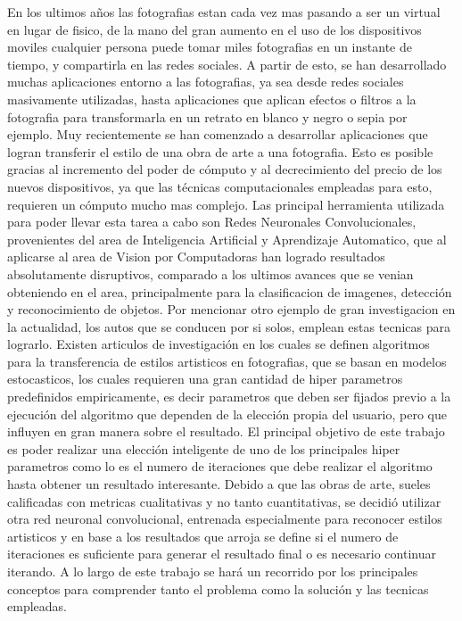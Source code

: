 \documentclass[a4paper,10pt]{article}
\begin{document}
En los ultimos años las fotografias estan cada vez mas pasando a ser un virtual en lugar de fisico, de la mano del gran aumento en el uso de los dispositivos moviles 
cualquier persona puede tomar miles fotografias en un instante de tiempo, y compartirla en las redes sociales.
A partir de esto, se han desarrollado muchas aplicaciones entorno a las fotografias, ya sea desde redes sociales masivamente utilizadas, hasta aplicaciones que aplican efectos o filtros 
a la fotografia para transformarla en un retrato en blanco y negro o sepia por ejemplo.
Muy recientemente se han comenzado a desarrollar aplicaciones que logran transferir el estilo de una obra de arte a una fotografia. Esto es posible gracias al incremento 
del poder de cómputo y al decrecimiento del precio de los nuevos dispositivos, ya que las técnicas computacionales empleadas para esto, requieren un cómputo mucho mas complejo.
Las principal herramienta utilizada para poder llevar esta tarea a cabo son Redes Neuronales Convolucionales, provenientes del area de  
Inteligencia Artificial y Aprendizaje Automatico, que al aplicarse al area de Vision por Computadoras han logrado resultados absolutamente disruptivos, 
comparado a los ultimos avances que se venian obteniendo en el area, principalmente para la clasificacion de imagenes, detección y reconocimiento de objetos.
Por mencionar otro ejemplo de gran investigacion en la actualidad, los autos que se conducen por si solos, emplean estas tecnicas para lograrlo.
Existen articulos de investigación en los cuales se definen algoritmos para la transferencia de estilos artisticos en fotografias, que se basan en modelos estocasticos, 
los cuales requieren una gran cantidad de hiper parametros predefinidos empiricamente, es decir parametros que deben ser fijados previo a la ejecución del algoritmo que dependen 
de la elección propia del usuario, pero que influyen en gran manera sobre el resultado.
El principal objetivo de este trabajo es poder realizar una elección inteligente de uno de los principales hiper parametros como lo es el numero de iteraciones 
que debe realizar el algoritmo hasta obtener un resultado interesante.
Debido a que las obras de arte, sueles calificadas con metricas cualitativas y no tanto cuantitativas, se decidió utilizar otra red neuronal convolucional, 
entrenada especialmente para reconocer estilos artisticos y en base a los resultados que arroja se define si el numero de iteraciones es suficiente para generar el resultado final 
o es necesario continuar iterando.
A lo largo de este trabajo se hará un recorrido por los principales conceptos para comprender tanto el problema como la solución y las tecnicas empleadas.
\end{document}
